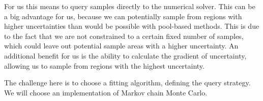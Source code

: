 For us this means to query samples directly to the numerical solver. This can be a big advantage for us, because we can potentially sample from regions with higher uncertainties than would be possible with pool-based methods. This is due to the fact that we are not constrained to a certain fixed number of samples, which could leave out potential sample areas with a higher uncertainty. An additional benefit for us is the ability to calculate the gradient of uncertainty, allowing us to sample from regions with the highest uncertainty.

The challenge here is to choose a fitting algorithm, defining the 
query strategy. 
We will choose an implementation of Markov chain Monte Carlo.


